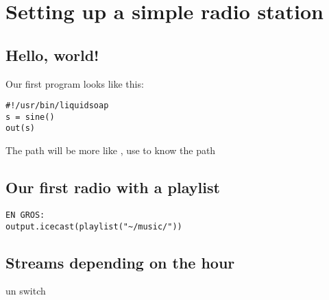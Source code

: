 \chapter{Setting up a simple radio station}
\section{Hello, world!}
Our first program looks like this:
\begin{lstlisting}
#!/usr/bin/liquidsoap
s = sine()
out(s)
\end{lstlisting}

The path will be more like , use  to know the path

\section{Our first radio with a playlist}
\begin{verbatim}
EN GROS:
output.icecast(playlist("~/music/"))
\end{verbatim}

\section{Streams depending on the hour}
un switch
